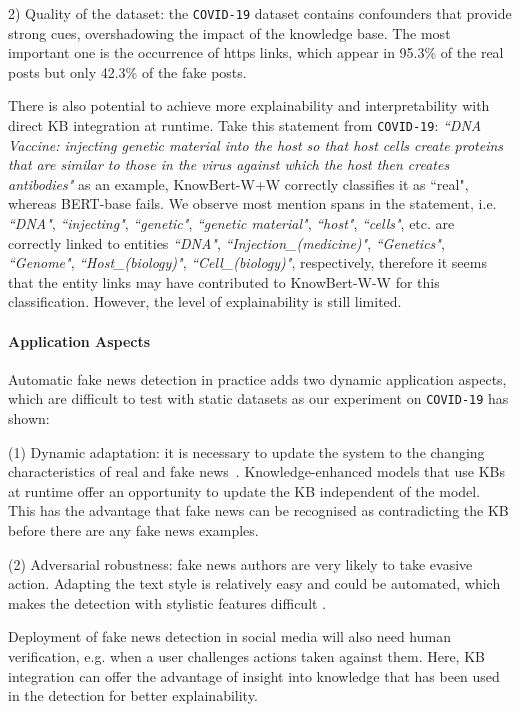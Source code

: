 \documentclass[letterpaper]{article} %
\begin{document}
2) Quality of the dataset:
the \texttt{COVID-19} dataset contains confounders that provide strong cues, overshadowing the impact of the knowledge base.
The most important one is the occurrence of https links, which appear in 95.3\% of the real posts but only 42.3\% of the fake posts.

There is also potential to achieve more explainability and interpretability with direct KB integration at runtime.
Take this statement from \texttt{COVID-19}: \textit{``DNA Vaccine: injecting genetic material into the host so that host cells create proteins that are similar to those in the virus against which the host then creates antibodies"} as an example,
KnowBert-W+W correctly classifies it as ``real", whereas BERT-base fails.
We observe most mention spans in the statement, i.e.  \textit{``DNA"}, \textit{``injecting"}, \textit{``genetic"}, \textit{``genetic material"}, \textit{``host"}, \textit{``cells"}, etc. are correctly linked to entities \textit{``DNA"}, \textit{``Injection\_(medicine)"}, \textit{``Genetics"}, \textit{``Genome"}, \textit{``Host\_(biology)"}, \textit{``Cell\_(biology)"}, respectively,
therefore it seems that the entity links may have contributed to KnowBert-W-W for this classification.
However, the level of explainability is still limited.


\paragraph{Application Aspects}
Automatic fake news detection in practice adds two dynamic application aspects, which are difficult to test with static datasets as our experiment on \texttt{COVID-19} has shown:

(1) Dynamic adaptation: it is necessary to update the system to the changing characteristics of real and fake news~\cite{silva2021concept}.
Knowledge-enhanced models that use KBs at runtime offer an opportunity to update the KB independent of the model. %
This has the advantage that fake news can be recognised as contradicting the KB before there are any fake news examples.

(2) Adversarial robustness: fake news authors are very likely to take evasive action.
Adapting the text style is relatively easy and could be automated, which makes the detection with stylistic features difficult \citep[see][]{NEURIPS2019_3e9f0fc9, schuster-etal-2020-limitations}.

Deployment of fake news detection in social media will also need human verification, e.g. when a user challenges actions taken against them.
Here, KB integration can offer the advantage of insight into knowledge that has been used in the detection for better explainability.
\end{document}
